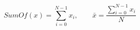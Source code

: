 \documentclass[a4paper,12pt]{article}
\begin{document}
\begin{equation}
	\mathit{SumOf}(x) = \sum_{i=0}^{N-1} x_{i},\qquad
	\bar{x} = \frac{\sum_{i=0}^{N-1} x_{i}}{N}
\end{equation}
\end{document}
